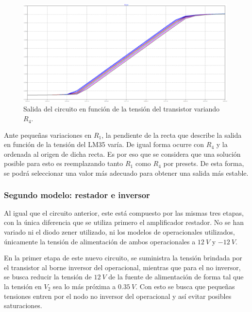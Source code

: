 \documentclass[a4paper]{article}
\begin{document}
\begin{figure}[H]
	\centering
	\includegraphics[width=0.99\textwidth]{Ejercicio6/Imagenes/StepR4-M1.png}
	\caption{Salida del circuito en función de la tensión del transistor variando $R_4$.}
	\label{fig:r4-M1}
\end{figure}

Ante pequeñas variaciones en $R_1$, la pendiente de la recta que describe la salida en función de la tensión del LM35 varía. De igual forma ocurre con $R_4$ y la ordenada al origen de dicha recta. Es por eso que se considera que una solución posible para esto es reemplazando tanto $R_1$ como $R_4$ por presets. De esta forma, se podrá seleccionar una valor más adecuado para obtener una salida más estable.

\subsubsection{Segundo modelo: restador e inversor}

Al igual que el circuito anterior, este está compuesto por las mismas tres etapas, con la única diferencia que se utiliza primero el amplificador restador. No se han variado ni el diodo zener utilizado, ni los modelos de operacionales utilizados, únicamente la tensión de alimentación de ambos operacionales a $12 \ V$ y $-12 \ V$.

En la primer etapa de este nuevo circuito, se suministra la tensión brindada por el transistor al borne inversor del operacional, mientras que para el no inversor, se busca reducir la tensión de $12 \ V$ de la fuente de alimentación de forma tal que la tensión en $V_2$ sea lo más próxima a $0.35 \ V$. Con esto se busca que pequeñas tensiones entren por el nodo no inversor del operacional y así evitar posibles saturaciones.
\end{document}
